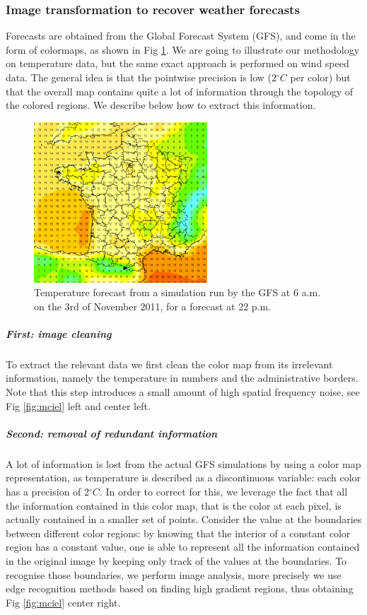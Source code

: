 \subsubsection{Image transformation to recover weather forecasts}
\label{picturemethodo}

Forecasts are obtained from the Global Forecast System (GFS), and come in the form of colormaps, as shown in Fig \ref{fig:refmeteociel}. We are going to illustrate our methodology on temperature data, but the same exact approach is performed on wind speed data. The general idea is that the pointwise precision is low (2$^{\circ}C$ per color) but that the overall map contains quite a lot of information through the topology of the colored regions. We describe below how to extract this information. 
 
\begin{figure}[!ht]
\begin{center} \includegraphics[height=60mm]{forqgis/ref-2011-11-03-15.png}
\end{center}
\caption{\small Temperature forecast from a simulation run by the GFS at 6 a.m. on the 3rd of November 2011, for a forecast at 22 p.m. }
\label{fig:refmeteociel}
\end{figure}

\subparagraph{First: image cleaning} To extract the relevant data we first clean the color map from its irrelevant information, namely the temperature in numbers and the administrative borders. Note that this step introduces a small amount of high spatial frequency noise, see Fig \ref{fig:mciel} left and center left. 

\subparagraph{Second: removal of redundant information} A lot of information is lost from the actual GFS simulations by using a color map representation, as temperature is described as a discontinuous variable: each color has a precision of 2$^{\circ}C$. In order to correct for this, we leverage the fact that all the information contained in this color map, that is the color at each pixel, is actually contained in a smaller set of points. Consider the value at the boundaries between different color regions: by knowing that the interior of a constant color region has a constant value, one is able to represent all the information contained in the original image by keeping only track of the values at the boundaries. To recognise those boundaries, we perform image analysis, more precisely we use edge recognition methods based on finding high gradient regions, thus obtaining Fig \ref{fig:mciel} center right. 

